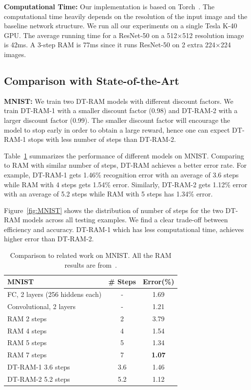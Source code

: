 \documentclass[10pt,twocolumn,letterpaper]{article}
\begin{document}
{\bf Computational Time:} Our implementation is based on Torch~\cite{collobert2011torch7}.
The computational time heavily depends on the resolution of the input image and the baseline network structure.
We run all our experiments on a single Tesla K-40 GPU.
The average running time for a ResNet-50 on a 512$\times$512 resolution image is 42ms. A 3-step RAM is 77ms since it runs ResNet-50 on 2 extra 224$\times$224 images.

\subsection{Comparison with State-of-the-Art}

{\bf MNIST:}  We train two DT-RAM models with different discount factors. We train DT-RAM-1 with a smaller discount factor (0.98) and DT-RAM-2 with a larger discount factor (0.99). The smaller discount factor will encourage the model to stop early in order to obtain a large reward, hence one can expect DT-RAM-1 stops with less number of steps than DT-RAM-2.

Table~\ref{tab:mnist} summarizes the performance of different models on MNIST.
Comparing to RAM with similar number of steps, DT-RAM achieves a better error rate.
For example, DT-RAM-1 gets 1.46\% recognition error with an average of 3.6 steps while RAM with 4 steps gets 1.54\% error.
Similarly, DT-RAM-2 gets 1.12\% error with an average of 5.2 steps while RAM with 5 steps has 1.34\% error.

Figure~\ref{fig:MNIST} shows the distribution of number of steps for the two DT-RAM models across all testing examples.
We find a clear trade-off between efficiency and accuracy. DT-RAM-1 which has less computational time, achieves higher error than DT-RAM-2.

\begin{table}
  \centering
  \addtolength{\tabcolsep}{2.5pt}
    \begin{tabular}{l c c}
      \toprule[0.2 em]
      {\bf MNIST} & \# Steps & Error(\%)  \\
      \toprule[0.2 em]
      \midrule
      FC, 2 layers (256 hiddens each) & - & 1.69 \\
      Convolutional, 2 layers & - & 1.21 \\
      RAM 2 steps & 2 & 3.79 \\
      RAM 4 steps & 4 & 1.54 \\
      RAM 5 steps & 5 & 1.34 \\
      RAM 7 steps & 7 & {\bf 1.07} \\
      \midrule
      DT-RAM-1 3.6 steps & 3.6 & 1.46 \\
      DT-RAM-2 5.2 steps & 5.2 & 1.12 \\
      \bottomrule[0.1 em]
    \end{tabular}
    \vspace{1pt}
    \caption{Comparison to related work on MNIST. All the RAM results are from~\cite{mnih2014recurrent}. }
    \label{tab:mnist}
\end{table}
\end{document}
